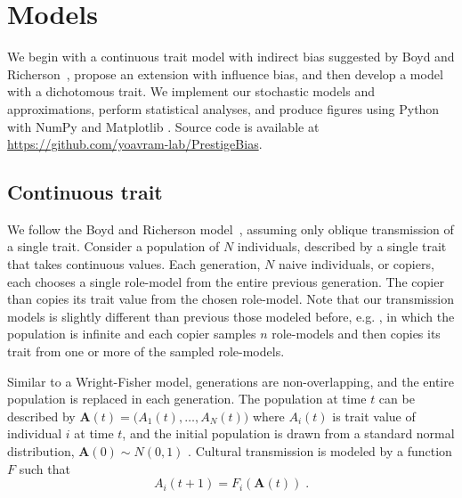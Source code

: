 \documentclass[12pt]{extarticle}
\let\vec\mathbf
\begin{document}
\section*{Models}
We begin with a continuous trait model with indirect bias suggested by Boyd and Richerson~\citep{evolutionBook}, propose an extension with influence bias, and then develop a model with a dichotomous trait.
We implement our stochastic models and approximations, perform statistical analyses, and produce figures using Python \citep{python} with NumPy \citep{numpy} and Matplotlib \citep{mathplotlib}. 
Source code is available at \href{https://github.com/yoavram-lab/PrestigeBias}{https://github.com/yoavram-lab/PrestigeBias}.

\subsection*{Continuous trait}
We follow the Boyd and Richerson model~\citep{evolutionBook}, assuming only oblique transmission of a single trait. 
Consider a population of $N$ individuals, described by a single trait that takes continuous values.
Each generation, $N$ naive individuals, or copiers, each chooses a single role-model from the entire previous generation. The copier than copies its trait value from the chosen role-model.
Note that our transmission models is slightly different than previous those modeled before, e.g. \citep{cumul_culture,anticonformity,evolutionBook}, in which the population is infinite and each copier samples $n$ role-models and then copies its trait from one or more of the sampled role-models.

Similar to a Wright-Fisher model, generations are non-overlapping, and the entire population is replaced in each generation.
The population at time $t$ can be described by $\vec{A}(t)=\big(A_{1}(t), \ldots, A_{N}(t)\big)$ where $A_{i}(t)$ is trait value of individual $i$ at time $t$, and  the initial population is drawn from a standard normal distribution, $\vec{A}(0) \sim N(0,1)$ .
Cultural transmission is modeled by a function $F$ such that 
\begin{equation}\label{eq:transmission}
A_{i}(t+1) = F_i(\vec{A}(t)) \;.
\end{equation}
\end{document}
